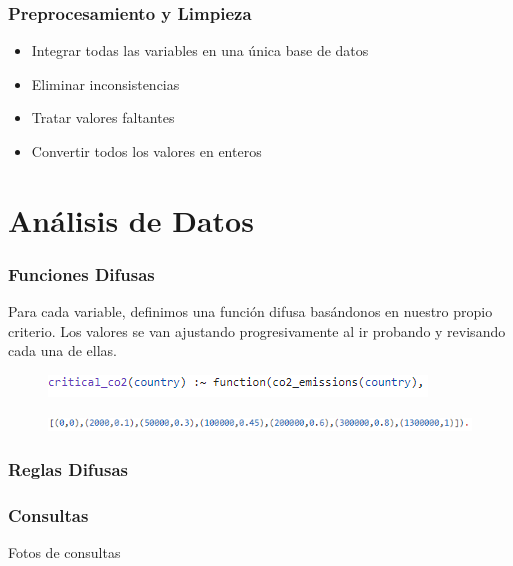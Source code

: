 \documentclass{beamer}
\newcommand{\slideauthor}[1]{\def\insertslideauthor{#1}}
\newcommand{\insertslideauthor}{}
\begin{document}
\begin{frame}
\frametitle{Preprocesamiento y Limpieza}
\slideauthor{Javier Comyn}
\begin{itemize}
    \item Integrar todas las variables en una única base de datos
    \item Eliminar inconsistencias
    \item Tratar valores faltantes
    \item Convertir todos los valores en enteros
\end{itemize}
\end{frame}

\section{Análisis de Datos}

\begin{frame}
\frametitle{Funciones Difusas}
\slideauthor{Javier Comyn}
Para cada variable, definimos una función difusa basándonos en nuestro propio criterio. Los valores se van ajustando progresivamente al ir probando y revisando cada una de ellas.
\vspace*{+5mm} %
\begin{figure}
\includegraphics[width=\textwidth]{co2_1.png} 
\end{figure}
\vspace*{-5mm} %
\begin{figure}
\includegraphics[width=\textwidth]{co2_2.png} 
\end{figure}
\end{frame}

\begin{frame}
\frametitle{Reglas Difusas}
\slideauthor{Javier Comyn}
\end{frame}

\begin{frame}
\frametitle{Consultas}
\slideauthor{Javier Comyn}
Fotos de consultas
\end{frame}
\end{document}
